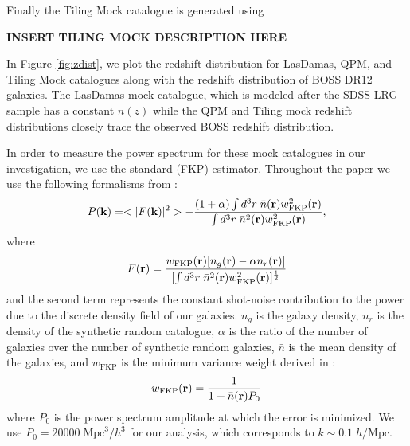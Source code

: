 \documentclass{emulateapj}
\begin{document}
Finally the Tiling Mock catalogue is generated using 

{\bf INSERT TILING MOCK DESCRIPTION HERE}

In Figure \ref{fig:zdist}, we plot the redshift distribution for LasDamas, QPM, and Tiling Mock catalogues along with the redshift distribution of BOSS DR12 galaxies. The LasDamas mock catalogue, which is modeled after the SDSS LRG sample has a constant $\bar{n}(z)$ while the QPM and Tiling mock redshift distributions closely trace the observed BOSS redshift distribution. 

In order to measure the power spectrum for these mock catalogues in our investigation, we use the standard \cite{Feldman:1994aa} (FKP) estimator. Throughout the paper we use the following formalisms from \cite{Feldman:1994aa}: 
\begin{equation} \label{eq:fkppk}
P({\bf k}) = <|F({\bf k})|^2> - \frac{(1+\alpha) \int d^3r \;\bar{n}({\bf r})w_{\mathrm{FKP}}^2({\bf r})} {\int d^3r \; \bar{n}^2({\bf r})w_{\mathrm{FKP}}^2({\bf r})},
\end{equation}  
where
\begin{equation}
F({\bf r}) = \frac{w_\mathrm{FKP}({\bf r}) [n_g({\bf r}) - \alpha n_r({\bf r})]} {[\int d^3r \; \bar{n}^2({\bf r})w_\mathrm{FKP}^2({\bf r})]^{\frac{1}{2}}} 
\end{equation}
and the second term represents the constant shot-noise contribution to the power due to the discrete density field of our galaxies. $n_g$ is the galaxy density, $n_r$ is the density of the synthetic random catalogue, $\alpha$ is the ratio of the number of galaxies over the number of synthetic random galaxies, $\bar{n}$ is the mean density of the galaxies, and $w_{\mathrm{FKP}}$ is the minimum variance weight derived in \cite{Feldman:1994aa}: 
\begin{equation}
w_{\mathrm{FKP}} ({\bf r}) = \frac{1}{1+\bar{n}({\bf r}) P_0}
\end{equation}
where $P_0$ is the power spectrum amplitude at which the error is minimized. We use $P_0 = 20000\; \mathrm{Mpc}^3/h^3$ for our analysis, which corresponds to $k \sim 0.1\; h/\mathrm{Mpc}$.  
\end{document}
